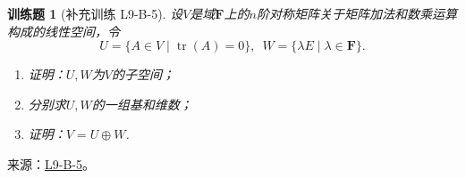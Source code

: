 \documentclass[12pt,fontset=fandol]{ctexart}
\newtheorem{exercise}{训练题}[section]
\begin{document}
\begin{exercise}[补充训练 L9-B-5]\label{prob:L9-B-5}
设$V$是域$\mathbf{F}$上的$n$阶对称矩阵关于矩阵加法和数乘运算构成的线性空间，令
        \[U=\{A\in V \mid \operatorname{tr}(A)=0\},\enspace W=\{\lambda E \mid \lambda\in\mathbf{F}\}.\]
        \begin{enumerate}
            \item 证明：$U,W$为$V$的子空间；

            \item 分别求$U,W$的一组基和维数；

            \item 证明：$V=U\oplus W$.
        \end{enumerate}
\end{exercise}
\noindent 来源：\href{https://github.com/yhwu-is/Linear-Algebra-Left-Undone/blob/new/%E8%AE%B2%E4%B9%89/%E4%B8%93%E9%A2%98/9%20%E7%9F%A9%E9%98%B5%E8%BF%90%E7%AE%97%E8%BF%9B%E9%98%B6.tex}{L9-B-5}。
\end{document}
